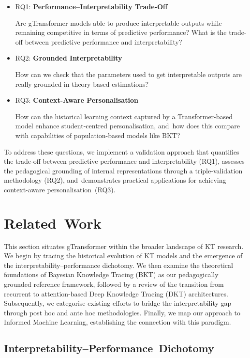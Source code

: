 \documentclass[applsci,article,accept,moreauthors,pdftex]{Definitions/mdpi}
\begin{document}
\begin{itemize}
\item RQ1: \textbf{Performance--Interpretability Trade-Off}

Are gTransformer models able to produce interpretable outputs while remaining competitive in terms of predictive performance? What is the trade-off between predictive performance and interpretability?

\item RQ2: \textbf{Grounded Interpretability}

How can we check that the parameters used to get interpretable outputs are really grounded in theory-based estimations?  

\item RQ3: {\textbf{Context-Aware Personalisation}}

How can the historical learning context captured by a Transformer-based model enhance {student-centred personalisation}, and~how does this compare with capabilities of population-based models like BKT?

\end{itemize}


{To address these questions, we implement a validation approach that quantifies the trade-off between predictive performance and interpretability (RQ1), assesses the pedagogical grounding of internal representations through a triple-validation methodology (RQ2), and~demonstrates practical applications for achieving context-aware personalisation~(RQ3).}


\section{Related~Work} \label{sec_related}

{This section situates gTransformer within the broader landscape of KT research. We begin by tracing the historical evolution of KT models and the emergence of the interpretability--performance dichotomy. We then examine the theoretical foundations of Bayesian Knowledge Tracing (BKT) as our pedagogically grounded reference framework, followed by a review of the transition from recurrent to attention-based Deep Knowledge Tracing (DKT) architectures. Subsequently, we categorise existing efforts to bridge the interpretability gap through post hoc and ante hoc methodologies. Finally, we map our approach to Informed Machine Learning, establishing the connection with this paradigm.}


\subsection{Interpretability--Performance~Dichotomy} \label{sec_dichotomy}
\end{document}
